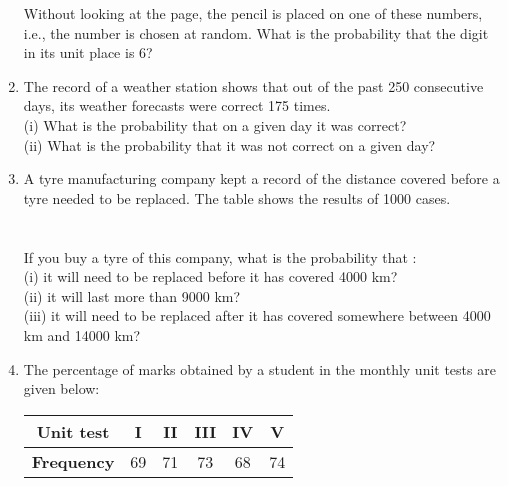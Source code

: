 \begin{enumerate}[label=\arabic*.,ref=\thesubsection.\theenumi]
Without looking at the page, the pencil is placed on one of these numbers, i.e., the number is chosen at random. What is the probability that the digit in its unit place is 6?\\
   \item The record of a weather station shows that out of the past 250 consecutive days, its weather forecasts were correct 175 times.\\
   (i) What is the probability that on a given day it was correct?\\
(ii) What is the probability that it was not correct on a given day?\\
\item A tyre manufacturing company kept a record of the distance covered
before a tyre needed to be replaced. The table shows the results of 1000 cases.\\
\\
\\

If you buy a tyre of this company, what is the probability that :\\
(i) it will need to be replaced before it has covered 4000 km?\\
(ii) it will last more than 9000 km?\\
(iii) it will need to be replaced after it has covered somewhere between 4000 km and 14000 km?\\
\item The percentage of marks obtained by a student in the monthly unit tests are given below:\\

\begin{tabular}{ |c|c|c|c|c|c| } 
 \hline
 \textbf{Unit test} &I &II &III &IV &V \\ 
 \hline
 \textbf{Frequency }&69 &71 &73 &68 &74\\ 
 \hline
\end{tabular}\\


\end{enumerate}
